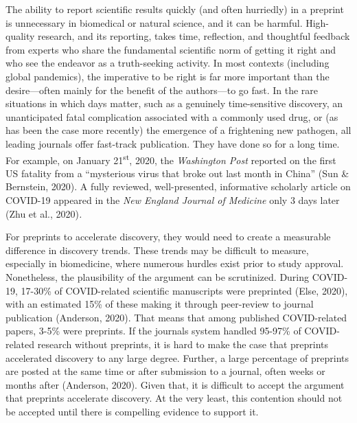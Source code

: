 \documentclass[authordate, perspective]{jote-new-article}
\begin{document}
	The ability to report scientific results quickly (and often hurriedly) in a preprint is unnecessary in biomedical or natural science, and it can be harmful. High-quality research, and its reporting, takes time, reflection, and thoughtful feedback from experts who share the fundamental scientific norm of getting it right and who see the endeavor as a truth-seeking activity. In most contexts (including global pandemics), the imperative to be right is far more important than the desire—often mainly for the benefit of the authors—to go fast. In the rare situations in which days matter, such as a genuinely time-sensitive discovery, an unanticipated fatal complication associated with a commonly used drug, or (as has been the case more recently) the emergence of a frightening new pathogen, all leading journals offer fast-track publication. They have done so for a long time. For example, on January 21\textsuperscript{st}, 2020, the \emph{Washington Post }reported on the first US fatality from a “mysterious virus that broke out last month in China” (Sun \& Bernstein, 2020). A fully reviewed, well-presented, informative scholarly article on COVID-19 appeared in the \emph{New England Journal of Medicine }only 3 days later (Zhu et al., 2020)\emph{.}







	For preprints to accelerate discovery, they would need to create a measurable difference in discovery trends. These trends may be difficult to measure, especially in biomedicine, where numerous hurdles exist prior to study approval. Nonetheless, the plausibility of the argument can be scrutinized. During COVID-19, 17-30\% of COVID-related scientific manuscripts were preprinted (Else, 2020), with an estimated 15\% of these making it through peer-review to journal publication (Anderson, 2020). That means that among published COVID-related papers, 3-5\% were preprints. If the journals system handled 95-97\% of COVID-related research without preprints, it is hard to make the case that preprints accelerated discovery to any large degree. Further, a large percentage of preprints are posted at the same time or after submission to a journal, often weeks or months after (Anderson, 2020). Given that, it is difficult to accept the argument that preprints accelerate discovery. At the very least, this contention should not be accepted until there is compelling evidence to support it.
\end{document}
